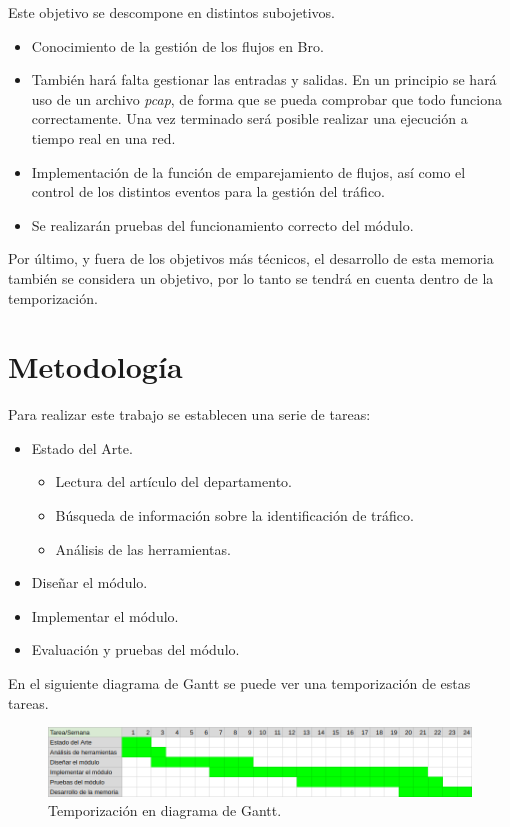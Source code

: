 \intro Este objetivo se descompone en distintos subojetivos.

\begin{itemize}
\item Conocimiento de la gestión de los flujos en Bro.
\item También hará falta gestionar las entradas y salidas. En un principio se hará uso de un archivo \textit{pcap}, de forma 
que se pueda comprobar que todo funciona correctamente. Una vez terminado será posible realizar una ejecución a tiempo real en una 
red.
\item Implementación de la función de emparejamiento de flujos, así como el control de los distintos eventos para la gestión del 
tráfico.
\item Se realizarán pruebas del funcionamiento correcto del módulo.
\end{itemize}

\intro Por último, y fuera de los objetivos más técnicos, el desarrollo de esta memoria también se considera un objetivo, por 
lo tanto se tendrá en cuenta dentro de la temporización.

\section{Metodología}

Para realizar este trabajo se establecen una serie de tareas:

\begin{itemize}
\item Estado del Arte.
	\begin{itemize}
	\item Lectura del artículo del departamento. \cite{comparacion}
	\item Búsqueda de información sobre la identificación de tráfico.
	\item Análisis de las herramientas.
	\end{itemize}
\item Diseñar el módulo.
\item Implementar el módulo.
\item Evaluación y pruebas del módulo.
\end{itemize}

\intro En el siguiente diagrama de Gantt se puede ver una temporización de estas tareas. 

\begin{figure}[H]
  \includegraphics[width=1\textwidth]{imagenes/temporizacion.png} 
  \centering
  \caption{Temporización en diagrama de Gantt.}
\end{figure}

